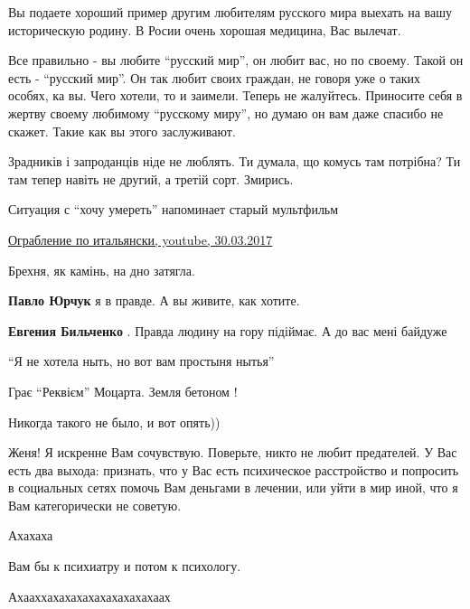 \begin{itemize}

Вы подаете хороший пример другим любителям русского мира выехать на вашу
историческую родину. В Росии очень хорошая медицина, Вас вылечат.


Все правильно - вы любите \enquote{русский мир}, он любит вас, но по своему. Такой он
есть - \enquote{русский мир}. Он так любит своих граждан, не говоря уже о таких особях,
ка вы. Чего хотели, то и заимели. Теперь не жалуйтесь. Приносите себя в жертву
своему любимому \enquote{русскому миру}, но думаю он вам даже спасибо не скажет. Такие
как вы этого заслуживают.



Зрадників і запроданців ніде не люблять. Ти думала, що комусь там потрібна? Ти
там тепер навіть не другий, а третій сорт. Змирись.

Ситуация с \enquote{хочу умереть} напоминает старый мультфильм 

\href{https://www.youtube.com/watch?v=SNcAyJ9dGG4}{%
Ограбление по итальянски, youtube, 30.03.2017%
}

Брехня, як камінь, на дно затягла.

\begin{itemize} %
\textbf{Павло Юрчук} я в правде. А вы живите, как хотите.

\textbf{Евгения Бильченко} . Правда людину на гору підіймає.
А до вас мені байдуже
\end{itemize} %

\enquote{Я не хотела ныть, но вот вам простыня нытья}

Грає \enquote{Реквієм} Моцарта. Земля бетоном !

Никогда такого не было, и вот опять))


Женя! Я искренне Вам сочувствую. Поверьте, никто не любит предателей. У Вас
есть два выхода: признать, что у Вас есть психическое расстройство и попросить
в социальных сетях помочь Вам деньгами в лечении, или уйти в мир иной, что я
Вам категорически не советую.

Ахахаха

Вам бы к психиатру и потом к психологу.

Ахааххахахахахахахахахахаах


\end{itemize}
